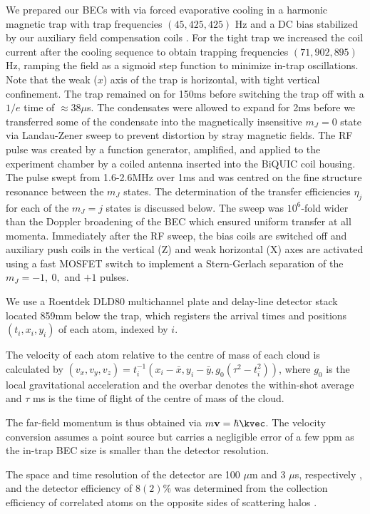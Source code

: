 	We prepared our BECs with via forced evaporative cooling in a harmonic magnetic trap with trap frequencies $(45,425,425)$ Hz and a DC bias stabilized by our auxiliary field compensation coils \cite{Dall07,Dedman07}.
	For the tight trap we increased the coil current after the cooling sequence to obtain trapping frequencies $(71,902,895)$ Hz, ramping the field as a sigmoid step function to minimize in-trap oscillations.
	Note that the weak ($x$) axis of the trap is horizontal, with tight vertical confinement.
	The trap remained on for 150ms before switching the trap off with a $1/e$ time of $\approx38\mu$s.
	The condensates were allowed to expand for 2ms before we transferred some of the condensate into the magnetically insensitive $m_J=0$ state via Landau-Zener sweep to prevent distortion by stray magnetic fields.
	The RF pulse was created by a  function generator, amplified, and applied to the experiment chamber by a coiled antenna inserted into the BiQUIC coil housing.
	The pulse swept from 1.6-2.6MHz over 1ms and was centred on the fine structure resonance between the $m_J$ states.
	The determination of the transfer efficiencies $\eta_j$ for each of the $m_J = j$ states is discussed below.
	The sweep was $10^6$-fold wider than the Doppler broadening of the BEC which ensured uniform transfer at all momenta.
	Immediately after the RF sweep, the bias coils are switched off and auxiliary push coils in the vertical (Z) and weak horizontal (X) axes are activated using a fast MOSFET switch to implement a Stern-Gerlach separation of the $m_J = -1,~0,$ and $+1$ pulses.

	We use a Roentdek DLD80 multichannel plate and delay-line detector stack \cite{Manning10} located 859mm below the trap, which registers the arrival times and positions $(t_i,x_i,y_i)$ of each atom, indexed by $i$.
	
	The velocity of each atom relative to the centre of mass of each cloud is calculated by $(v_x,v_y,v_z) = t_{i}^{-1}(x_i-\bar{x},y_i-\bar{y},g_0(\tau^2-t_{i}^{2}))$, where $g_0$ is the local gravitational acceleration and the overbar denotes the within-shot average and $\tau$ ms is the time of flight of the centre of mass of the cloud.
	
	The far-field momentum is thus obtained via $m\textbf{v} = \hbar\kvec$.
	The velocity conversion assumes a point source but carries a negligible error of a few ppm as the in-trap BEC size is smaller than the detector resolution.
	
	The space and time resolution of the detector are 100 $\mu$m and 3 $\mu$s, respectively \cite{Henson18}, and the detector efficiency of $8(2)\%$ was determined from the collection efficiency of correlated atoms on the opposite sides of scattering halos \cite{shin19,shin20,Jaskula10}.
	

